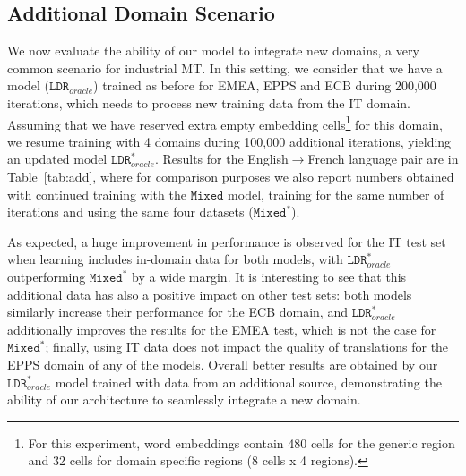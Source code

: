 \subsection{Additional Domain Scenario \label{ssec:additional_domain}}

We now evaluate the ability of our model to integrate new domains, a very common scenario for industrial MT. In this setting, we consider that we have a model ($\mathtt{LDR}_{oracle}$) trained as before for EMEA, EPPS and ECB during 200,000 iterations, which needs to process new training data from the IT domain. Assuming that we have reserved extra empty embedding cells\footnote{For this experiment, word embeddings contain 480 cells for the generic region and 32 cells for domain specific regions (8 cells x 4 regions).} for this domain, we resume training with 4 domains during 100,000 additional iterations, yielding an updated model  $\mathtt{LDR}_{oracle}^*$. Results for the English$\rightarrow$French language pair are in Table~\ref{tab:add}, where for comparison purposes we also report numbers obtained with continued training with the $\mathtt{Mixed}$ model, training for the same number of iterations and using the same four datasets ($\mathtt{Mixed}^*$).

\begin{table}[!h]
\begin{center}
\end{center}
\caption{BLEU scores for the Transformer architecture when including IT as additional domain \label{tab:add}}
\end{table}

As expected, a huge improvement in performance is observed for the IT test set when learning includes in-domain data for both models, with $\mathtt{LDR}_{oracle}^*$ outperforming $\mathtt{Mixed}^*$ by a wide margin.
%
It is interesting to see that this additional data has also a positive impact on other test sets: both models similarly increase their performance for the ECB domain, and $\mathtt{LDR}_{oracle}^*$ additionally improves the results for the EMEA test, which is not the case for $\mathtt{Mixed}^*$;
finally, using IT data does not impact the quality of translations for the EPPS domain of any of the models. Overall better results are obtained by our $\mathtt{LDR}_{oracle}^*$ model trained with data from an additional source, demonstrating the ability of our architecture to seamlessly integrate a new domain.
